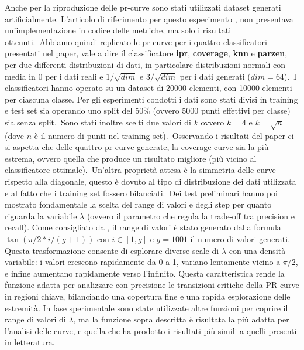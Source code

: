 Anche per la riproduzione delle pr-curve sono stati utilizzati dataset generati artificialmente. L'articolo di riferimento per questo esperimento \cite{pr-curve}, non presentava un'implementazione in codice delle metriche, ma solo i risultati ottenuti.\
Abbiamo quindi replicato le pr-curve per i quattro classificatori presentati nel paper, vale a dire il classificatore \textbf{ipr}, \textbf{coverage}, \textbf{knn} e \textbf{parzen}, per due differenti distribuzioni di dati, in particolare distribuzioni normali con media in \(0\) per i dati reali  e \(1/\sqrt{dim}\) e \(3/\sqrt{dim}\) per i dati generati (\(dim = 64\)).\ 
I classificatori hanno operato su un dataset di 20000 elementi, con 10000 elementi per ciascuna classe. Per gli esperimenti condotti i dati sono stati divisi in training e test set sia operando uno split del 50\% (ovvero 5000 punti effettivi per classe) sia senza split.\
Sono stati inoltre scelti due valori di \( k \) ovvero \(k = 4\) e \(k = \sqrt{n}\) (dove \(n\) è il numero di punti nel training set).\
Osservando i risultati del paper ci si aspetta che delle quattro pr-curve generate, la coverage-curve sia la più estrema, ovvero quella che produce un risultato migliore (più vicino al classificatore ottimale).\
Un'altra proprietà attesa è la simmetria delle curve rispetto alla diagonale, questo è dovuto al tipo di distribuzione dei dati utilizzata e al fatto che i training set fossero bilanciati.\
Dei test preliminari hanno poi mostrato fondamentale la scelta del range di valori e degli step per quanto riguarda la variabile \( \lambda \) (ovvero il parametro che regola la trade-off tra precision e recall). 
Come consigliato da \cite{unifying precision-recall}, il range di valori è stato generato dalla formula \( \tan(\pi/2 * i/(g+1)) \) con \( i \in [1, g] \) e \( g = 1001\) il numero di valori generati. Questa trasformazione consente di esplorare diverse scale di \(\lambda\) con una densità variabile: i valori crescono rapidamente da 0 a 1, variano lentamente vicino a \(\pi/2\)​, e infine aumentano rapidamente verso l'infinito. Questa caratteristica rende la funzione adatta per analizzare con precisione le transizioni critiche della PR-curve in regioni chiave, bilanciando una copertura fine e una rapida esplorazione delle estremità. 
In fase sperimentale sono state utilizzate altre funzioni per coprire il range di valori di \(\lambda\), ma la funzione sopra descritta è risultata la più adatta per l'analisi delle curve, e quella che ha prodotto i risultati più simili a quelli presenti in letteratura.

